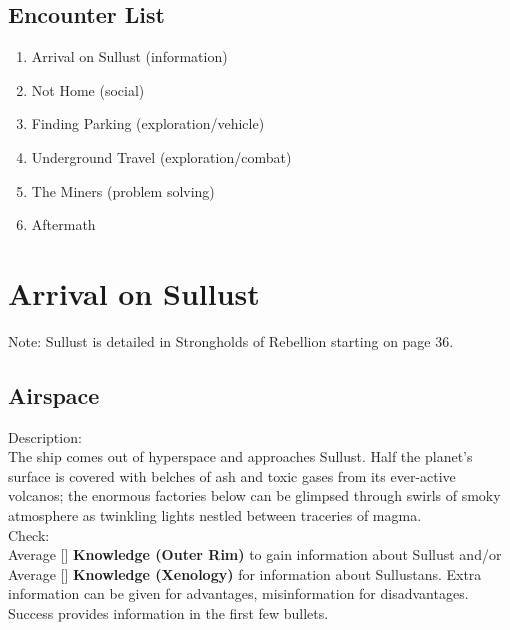 \documentclass{book}
\newcommand{\df}{\difficulty}
\begin{document}
\begin{multicols}{2}
\subsection{Encounter List}
\begin{enumerate}
    \item Arrival on Sullust (information)
    \item Not Home (social)
    \item Finding Parking (exploration/vehicle)
    \item Underground Travel (exploration/combat)
    \item The Miners (problem solving)
    \item Aftermath
\end{enumerate}

\section{Arrival on Sullust}

Note: Sullust is detailed in Strongholds of Rebellion starting on page 36.

\subsection{Airspace}

Description:\\
The ship comes out of hyperspace and approaches Sullust. Half the planet’s surface is covered with belches of ash and toxic gases from its ever-active volcanos; the enormous factories below can be glimpsed through swirls of smoky atmosphere as twinkling lights nestled between traceries of magma.\\
Check:\\
Average [\df\df] \textbf{Knowledge (Outer Rim)} to gain information about Sullust and/or Average [\df\df] \textbf{Knowledge (Xenology)} for information about Sullustans. Extra information can be given for advantages, misinformation for disadvantages. Success provides information in the first few bullets.\\


\end{multicols}
\end{document}
